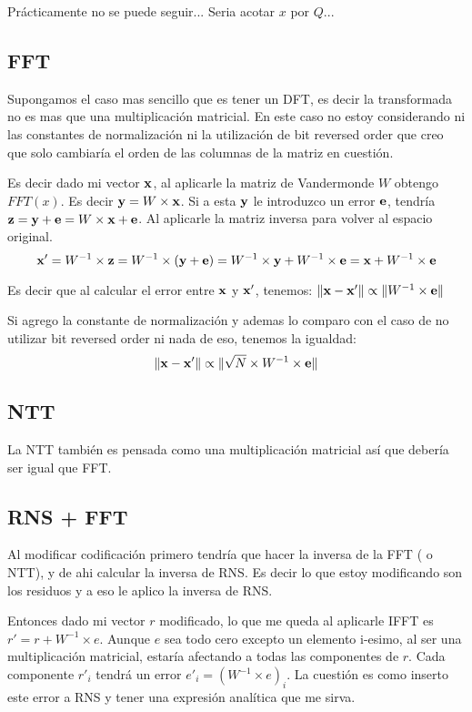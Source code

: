 \documentclass[12pt, oneside]{article}
\begin{document}
Prácticamente no se puede seguir... Seria acotar $x$ por $Q$...
\subsection{FFT}

Supongamos el caso mas sencillo que es tener un DFT, es decir la transformada no es mas que una
multiplicación matricial.
En este caso no estoy considerando ni las constantes de normalización ni la utilización de bit reversed order que
creo que solo cambiaría el orden de las columnas de la matriz en cuestión.

Es decir dado mi vector $\bold{x}$, al aplicarle la matriz de Vandermonde $W$ obtengo $FFT(x)$.
Es decir $ \bold{y} = W \times \bold{x}$.
Si a esta $\bold{y}$ le introduzco un error $\bold{e}$, tendría $\bold{z} = \bold{y} + \bold{e} = W\times \bold{x} + \bold{e}$.
Al aplicarle la matriz inversa para volver al espacio original.
\begin{equation*}
    \bold{x}' = W^{-1}\times \bold{z} = W^{-1}\times (\bold{y}+\bold{e}) = W^{-1}\times \bold{y} + W^{-1}\times \bold{e} = \bold{x} + W^{-1}\times \bold{e}
\end{equation*}

Es decir que al calcular el error entre $\bold{x}$ y $\bold{x}'$, tenemos:
$\lVert \bold{x}-\bold{x}' \rVert \propto \lVert W^{-1} \times \bold{e} \rVert$

Si agrego la constante de normalización y ademas lo comparo con el caso de no utilizar bit reversed order
ni nada de eso, tenemos la igualdad:
\begin{equation}
    \lVert \bold{x}-\bold{x}' \rVert \propto \lVert \sqrt{N} \times W^{-1} \times \bold{e} \rVert
\end{equation}

\subsection {NTT}
La NTT también es pensada como una multiplicación matricial así que debería  ser igual que FFT.

\subsection{RNS + FFT}
Al modificar codificación primero tendría que hacer la inversa de la FFT ( o NTT), y de ahi calcular la
inversa de RNS.
Es decir lo que estoy modificando son los residuos y a eso le aplico la inversa de RNS.

Entonces dado mi vector $r$ modificado, lo que me queda al aplicarle IFFT es  $r' = r + W^{-1}\times e$.
Aunque $e$ sea todo cero excepto un elemento i-esimo, al ser una multiplicación matricial,
estaría afectando a todas las componentes de $r$.
Cada componente $r'_i$ tendrá un error $e'_i = (W^{-1}\times e)_i$.
La cuestión es como inserto este error a RNS y tener una expresión analítica que me sirva.
\end{document}
